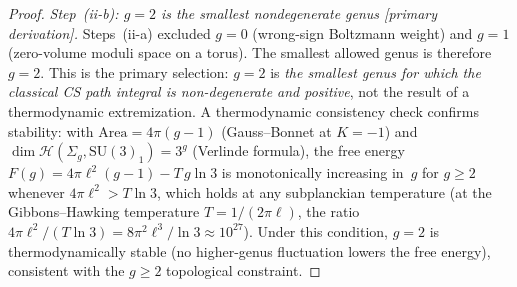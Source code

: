 \begin{proof}
\emph{Step~(ii-b): $g = 2$ is the smallest nondegenerate genus
[primary derivation].}
Steps~(ii-a) excluded $g = 0$ (wrong-sign Boltzmann weight)
and $g = 1$ (zero-volume moduli space on a torus).  The
smallest allowed genus is therefore $g = 2$.  This is the
primary selection: $g = 2$ is \emph{the smallest genus for
which the classical CS path integral is non-degenerate and
positive}, not the result of a thermodynamic extremization.
A thermodynamic consistency check confirms stability:
with $\mathrm{Area} = 4\pi(g{-}1)$ (Gauss--Bonnet at $K = -1$)
and $\dim\mathcal{H}(\Sigma_g, \mathrm{SU}(3)_1) = 3^g$
(Verlinde formula), the free energy
$F(g) = 4\pi\ell^2(g{-}1) - T\,g\ln 3$
is monotonically increasing in~$g$ for $g \ge 2$ whenever
$4\pi\ell^2 > T\ln 3$, which holds at any subplanckian
temperature (at the Gibbons--Hawking temperature
$T = 1/(2\pi\ell)$, the ratio $4\pi\ell^2/(T\ln 3) =
8\pi^2\ell^3/\ln 3 \approx 10^{27}$).  Under this condition,
$g = 2$ is thermodynamically stable (no higher-genus fluctuation
lowers the free energy), consistent with the $g \ge 2$
topological constraint.


\end{proof}
